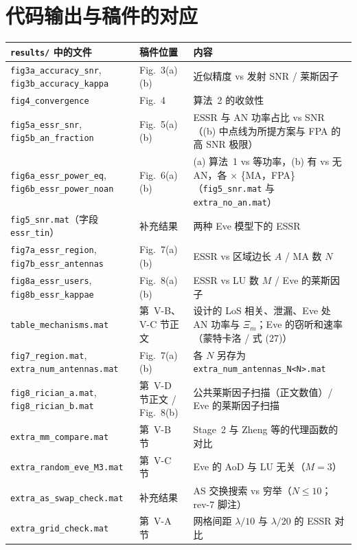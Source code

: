 \documentclass[11pt,a4paper]{ctexart}
\newcommand{\code}[1]{\texttt{#1}}
\begin{document}
\section{代码输出与稿件的对应}
\begin{center}\footnotesize
\begin{tabular}{p{6.0cm}p{2.6cm}p{6.6cm}}
\toprule
\code{results/} 中的文件 & 稿件位置 & 内容 \\ \midrule
\code{fig3a\_accuracy\_snr}, \code{fig3b\_accuracy\_kappa} & Fig.~3(a)(b) & 近似精度 vs 发射 SNR / 莱斯因子 \\
\code{fig4\_convergence} & Fig.~4 & 算法~2 的收敛性 \\
\code{fig5a\_essr\_snr}, \code{fig5b\_an\_fraction} & Fig.~5(a)(b) & ESSR 与 AN 功率占比 vs SNR（(b) 中点线为所提方案与 FPA 的高 SNR 极限）\\
\code{fig6a\_essr\_power\_eq}, \code{fig6b\_essr\_power\_noan} & Fig.~6(a)(b) & (a) 算法~1 vs 等功率，(b) 有 vs 无 AN，各 $\times$ \{MA，FPA\}（\code{fig5\_snr.mat} 与 \code{extra\_no\_an.mat}）\\
\code{fig5\_snr.mat}（字段 \code{essr\_tin}） & 补充结果 & 两种 Eve 模型下的 ESSR \\
\code{fig7a\_essr\_region}, \code{fig7b\_essr\_antennas} & Fig.~7(a)(b) & ESSR vs 区域边长 $A$ / MA 数 $N$ \\
\code{fig8a\_essr\_users}, \code{fig8b\_essr\_kappae} & Fig.~8(a)(b) & ESSR vs LU 数 $M$ / Eve 的莱斯因子 \\
\code{table\_mechanisms.mat} & 第~V-B、V-C 节正文 & 设计的 LoS 相关、泄漏、Eve 处 AN 功率与 $\Xi_m$；Eve 的窃听和速率（蒙特卡洛 / 式 (27)）\\
\code{fig7\_region.mat}, \code{extra\_num\_antennas.mat} & Fig.~7(a)(b) & 各 $N$ 另存为 \code{extra\_num\_antennas\_N<N>.mat} \\
\code{fig8\_rician\_a.mat}, \code{fig8\_rician\_b.mat} & 第~V-D 节正文 / Fig.~8(b) & 公共莱斯因子扫描（正文数值）/ Eve 的莱斯因子扫描 \\
\code{extra\_mm\_compare.mat} & 第~V-B 节 & Stage~2 与 Zheng 等的代理函数的对比 \\
\code{extra\_random\_eve\_M3.mat} & 第~V-C 节 & Eve 的 AoD 与 LU 无关（$M=3$）\\
\code{extra\_as\_swap\_check.mat} & 补充结果 & AS 交换搜索 vs 穷举（$N\le10$；rev-7 脚注）\\
\code{extra\_grid\_check.mat} & 第~V-A 节 & 网格间距 $\lambda/10$ 与 $\lambda/20$ 的 ESSR 对比 \\

\end{tabular}
\end{center}
\end{document}
